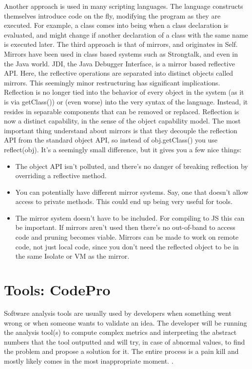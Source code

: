 	Another approach is used in many scripting languages. The language constructs themselves introduce code on the fly, modifying the program as they are executed. 
For example, a class comes into being when a class declaration is evaluated, and might change if another declaration of a class with the same name is executed later.
The third approach is that of mirrors, and originates in Self. Mirrors have
been used in class based systems such as Strongtalk, and even in the Java world. JDI, the Java Debugger Interface, is a mirror based reflective API. 
Here, the reflective operations are separated into distinct objects called mirrors. This seemingly minor restructuring has significant implications. 
Reflection is no longer tied into the behavior of every object in the system (as it is via getClass()) or (even worse) into the very syntax of the language.
Instead, it resides in separable components that can be removed or replaced. Reflection is now a distinct capability, in the sense of the object capability model.
	The most important thing understand about mirrors is that they decouple the reflection API from the standard object API, 
so instead of obj.getClass() you use reflect(obj). It's a seemingly small difference, but it gives you a few nice things:
	\begin{itemize}
		\item The object API isn't polluted, and there's no danger of breaking
reflection by overriding a reflective method.
		\item You can potentially have different mirror systems. Say, one that doesn't
allow access to private methods. This could end up being very useful for tools.
		\item The mirror system doesn't have to be included. For compiling to JS this
can be important. If mirrors aren't used then there's no out-of-band to access code and pruning becomes viable.
Mirrors can be made to work on remote code, not just local code, since you don't need the reflected object to be in the same Isolate or VM as the mirror.	
	\end{itemize}

\section{Tools: CodePro}\label{ch:2.2}


	
	Software analysis tools are usually used by developers when something went
wrong or when someone wants to validate an idea. The developer will be running
the analysis tool(s) to compute complex metrics and interpreting the abstract numbers 
that the tool outputted and will try, in case of abnormal values, to find the
problem and propose a solution for it. The entire process is a pain kill and
mostly likely comes in the most inappropriate moment. \cite{tools:inCode}.


